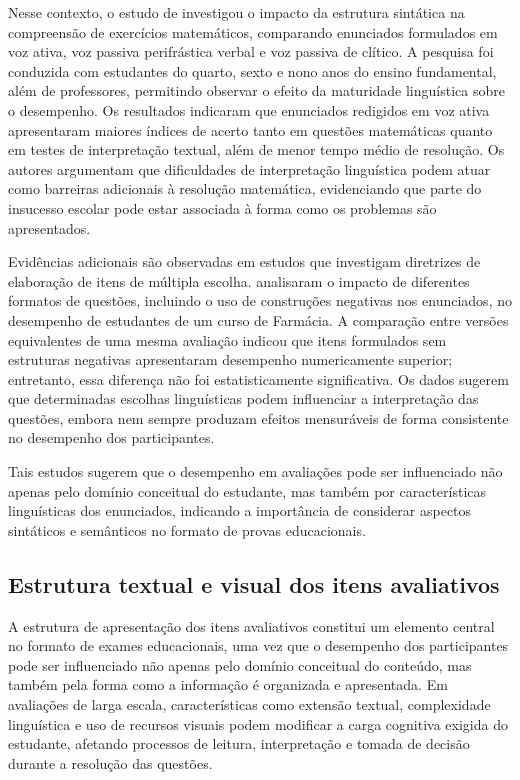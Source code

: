 \documentclass[a4paper,10pt, twocolumn]{article}
\begin{document}
Nesse contexto, o estudo de \textcite{correia2004complexidade} investigou o impacto da estrutura sintática na compreensão de exercícios matemáticos, comparando enunciados formulados em voz ativa, voz passiva perifrástica verbal e voz passiva de clítico. A pesquisa foi conduzida com estudantes do quarto, sexto e nono anos do ensino fundamental, além de professores, permitindo observar o efeito da maturidade linguística sobre o desempenho. Os resultados indicaram que enunciados redigidos em voz ativa apresentaram maiores índices de acerto tanto em questões matemáticas quanto em testes de interpretação textual, além de menor tempo médio de resolução. Os autores argumentam que dificuldades de interpretação linguística podem atuar como barreiras adicionais à resolução matemática, evidenciando que parte do insucesso escolar pode estar associada à forma como os problemas são apresentados.

Evidências adicionais são observadas em estudos que investigam diretrizes de elaboração de itens de múltipla escolha. \textcite{Caldwell2013} analisaram o impacto de diferentes formatos de questões, incluindo o uso de construções negativas nos enunciados, no desempenho de estudantes de um curso de Farmácia. A comparação entre versões equivalentes de uma mesma avaliação indicou que itens formulados sem estruturas negativas apresentaram desempenho numericamente superior; entretanto, essa diferença não foi estatisticamente significativa. Os dados sugerem que determinadas escolhas linguísticas podem influenciar a interpretação das questões, embora nem sempre produzam efeitos mensuráveis de forma consistente no desempenho dos participantes.

Tais estudos sugerem que o desempenho em avaliações pode ser influenciado não apenas pelo domínio conceitual do estudante, mas também por características linguísticas dos enunciados, indicando a importância de considerar aspectos sintáticos e semânticos no formato de provas educacionais.

\subsection{Estrutura textual e visual dos itens avaliativos}

A estrutura de apresentação dos itens avaliativos constitui um elemento central no formato de exames educacionais, uma vez que o desempenho dos participantes pode ser influenciado não apenas pelo domínio conceitual do conteúdo, mas também pela forma como a informação é organizada e apresentada. Em avaliações de larga escala, características como extensão textual, complexidade linguística e uso de recursos visuais podem modificar a carga cognitiva exigida do estudante, afetando processos de leitura, interpretação e tomada de decisão durante a resolução das questões.
\end{document}
